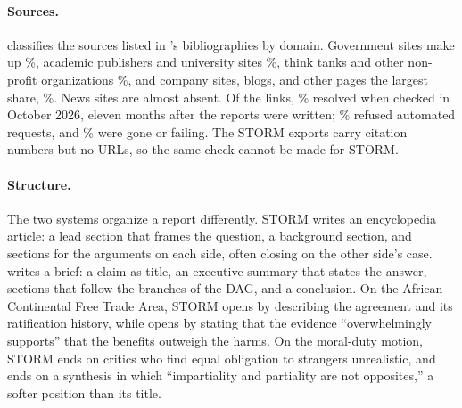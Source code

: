 \paragraph{Sources.}
 classifies the \srcN{} sources listed in \sys{}'s bibliographies by domain. Government sites make up \srcShareGovernment\%, academic publishers and university sites \srcShareAcademic\%, think tanks and other non-profit organizations \srcShareThinkTankOr\%, and company sites, blogs, and other pages the largest share, \srcShareCompanyBlogOrOther\%. News sites are almost absent. Of the \linkChecked{} links, \linkOkPct\% resolved when checked in October 2026, eleven months after the reports were written; \linkBlockedPct\% refused automated requests, and \linkDeadPct\% were gone or failing. The STORM exports carry citation numbers but no URLs, so the same check cannot be made for STORM.

\begin{table}[t]
\centering
\small

\caption{Domains of the \srcN{} sources listed in \sys{}'s ten bibliographies, classified by host name.}
\label{tab:sources}
\end{table}

\paragraph{Structure.}
The two systems organize a report differently. STORM writes an encyclopedia article: a lead section that frames the question, a background section, and sections for the arguments on each side, often closing on the other side's case. \sys{} writes a brief: a claim as title, an executive summary that states the answer, sections that follow the branches of the DAG, and a conclusion. On the African Continental Free Trade Area, STORM opens by describing the agreement and its ratification history, while \sys{} opens by stating that the evidence ``overwhelmingly supports'' that the benefits outweigh the harms. On the moral-duty motion, STORM ends on critics who find equal obligation to strangers unrealistic, and \sys{} ends on a synthesis in which ``impartiality and partiality are not opposites,'' a softer position than its title.

\begin{table}[t]
\centering
\small

\caption{Position of each \sys{} report. Side is relative to the motion as worded. The final paragraph is \emph{firm} if it restates the title's claim, \emph{qualified} if it limits the claim, \emph{conditional} if it makes the claim depend on unmet conditions or values, and \emph{compromise} if it answers neither side.}
\label{tab:stance}
\end{table}
